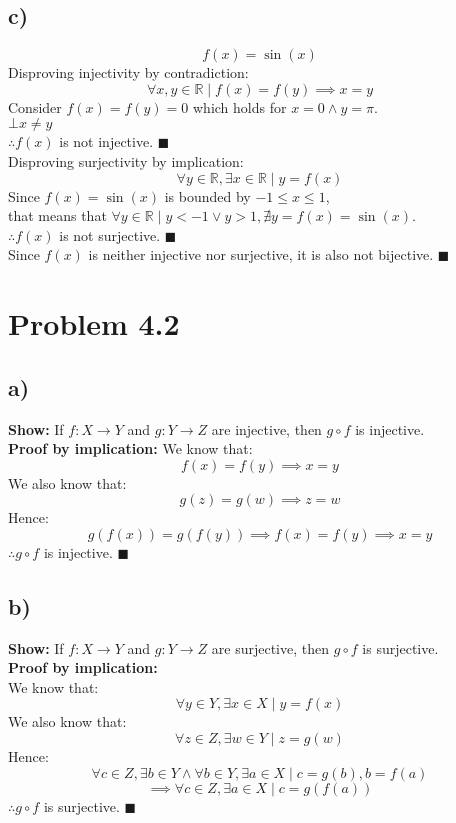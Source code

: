 \documentclass{article}
\begin{document}
\subsection*{c)}
\[
    f(x) = \sin(x)
\]
Disproving injectivity by contradiction:
\[
    \forall x,y \in \mathbb{R} \mid f(x) = f(y) \implies x = y   
\]
Consider $f(x) = f(y) = 0$ which holds for $x = 0 \land y = \pi$. \\
$\bot x \neq y$ \\
$\therefore f(x)$ is not injective. $\blacksquare$ \\
\newline
Disproving surjectivity by implication:
\[
    \forall y \in \mathbb{R}, \exists x \in \mathbb{R} \mid y = f(x) 
\]
Since $f(x) = \sin(x)$ is bounded by $-1 \leq x \leq 1$, \\
that means that 
$\forall y \in \mathbb{R} \mid y < -1 \lor y > 1, \nexists y = f(x) = \sin(x)$. \\
$\therefore f(x)$ is not surjective. $\blacksquare$ \\
\newline
Since $f(x)$ is neither injective nor surjective, it is also not bijective. $\blacksquare$ \\

\section*{Problem 4.2}
\subsection*{a)}
\textbf{Show:} If $f: X \rightarrow Y$ and $g:Y \rightarrow Z$ are injective, then
$g \circ f$ is injective. \\
\textbf{Proof by implication:}
We know that:
\[
    f(x) = f(y) \implies x = y
\]
We also know that:
\[
    g(z) = g(w) \implies z = w
\]
Hence:
\[
    g(f(x)) = g(f(y)) \implies f(x) = f(y) \implies x = y
\]
$\therefore g \circ f$ is injective. $\blacksquare$ \\

\subsection*{b)}
\textbf{Show:} If $f: X \rightarrow Y$ and $g:Y \rightarrow Z$ are surjective, then
$g \circ f$ is surjective. \\
\textbf{Proof by implication:} \\
We know that:
\[
    \forall y \in Y, \exists x \in X \mid y = f(x)
\]
We also know that:
\[
    \forall z \in Z, \exists w \in Y \mid z = g(w)
\]
Hence:
\[
    \forall c \in Z, \exists b \in Y \land \forall b \in Y, \exists a \in X 
    \mid c = g(b), b = f(a)
\]
\[
    \implies \forall c \in Z, \exists a \in X \mid c = g(f(a))
\]
$\therefore g \circ f$ is surjective. $\blacksquare$ \\
\end{document}
